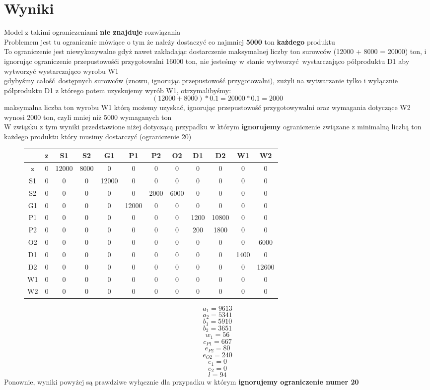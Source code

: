 \documentclass[12pt]{article}
\begin{document}
\section{Wyniki}
Model z takimi ograniczeniami \textbf{nie znajduje} rozwiązania \\
Problemem jest tu ogranicznie mówiące o tym że należy dostaczyć co najmniej \textbf{5000} ton \textbf{każdego} produktu \\
To ograniczenie jest niewykonywalne gdyż nawet zakładając dostarczenie maksymalnej liczby ton surowców (12000 + 8000 = 20000) ton, i ignorując ograniczenie przepustowośći przygotowalni 16000 ton, nie jesteśmy w stanie wytworzyć wystarczająco półproduktu D1 aby wytworzyć wystarczająco wyrobu W1 \\ 
gdybyśmy całość dostępnych surowców (znowu, ignorując przepustowość przygotowalni), zużyli na wytwarzanie tylko i wyłącznie półproduktu D1 z którego potem uzyskujemy wyrób W1, otrzymalibyśmy: 
\[ (12000 + 8000) * 0.1 = 20000 * 0.1 = 2000 \]
maksymalna liczba ton wyrobu W1 którą możemy uzyskać, ignorując przepustowość przygotowywalni oraz wymagania dotyczące W2 wynosi 2000 ton, czyli mniej niż 5000 wymaganych ton \\
W związku z tym wyniki przedstawione niżej dotyczącą przypadku w którym \textbf{ignorujemy} ograniczenie związane z minimalną liczbą ton każdego produktu który musimy dostarczyć (ograniczenie 20) \\
\begin{figure}[H]
\caption{}
\begin{tabular}{|c|c|c|c|c|c|c|c|c|c|c|c|}
\hline
 & 	z & S1 & S2 & G1 & P1 & P2 & O2 & D1 & D2 & W1 & W2 \\
\hline
z &	0 & 12000 & 8000 & 0 & 0 & 0 & 0 & 0 & 0 & 0 & 0 \\
\hline
S1 &	0 & 0 & 0 & 12000 & 0 & 0 & 0 & 0 & 0 & 0 & 0 \\
\hline
S2 &	0 & 0 & 0 & 0 & 0 & 2000 & 6000 & 0 & 0 & 0 & 0 \\
\hline
G1 &	0 & 0 & 0 & 0 & 12000 & 0 & 0 & 0 & 0 & 0 & 0 \\
\hline
P1 &	0 & 0 & 0 & 0 & 0 & 0 & 0 & 1200 & 10800 & 0 & 0 \\
\hline
P2 &	0 & 0 & 0 & 0 & 0 & 0 & 0 & 200 & 1800 & 0 & 0 \\
\hline
O2 &	0 & 0 & 0 & 0 & 0 & 0 & 0 & 0 & 0 & 0 & 6000 \\
\hline
D1 &	0 & 0 & 0 & 0 & 0 & 0 & 0 & 0 & 0 & 1400 & 0 \\
\hline
D2 &	0 & 0 & 0 & 0 & 0 & 0 & 0 & 0 & 0 & 0 & 12600 \\
\hline
W1 &	0 & 0 & 0 & 0 & 0 & 0 & 0 & 0 & 0 & 0 & 0 \\
\hline
W2 &	0 & 0 & 0 & 0 & 0 & 0 & 0 & 0 & 0 & 0 & 0 \\
\hline

\end{tabular}
\end{figure}

\[ a_1 = 9613 \]
\[ a_2 = 5341 \]
\[ b_1 = 5910 \]
\[ b_2 = 3651 \]
\[ w_1 = 56 \]
\[ c_{P1} = 667 \]
\[ e_{P2} = 80 \]
\[ e_{O2} = 240 \]
\[ e_1 = 0 \]
\[ e_2 = 0 \]
\[ l = 94 \]
Ponownie, wyniki powyżej są prawdziwe wyłącznie dla przypadku w którym \textbf{ignorujemy ograniczenie numer 20}
\end{document}

